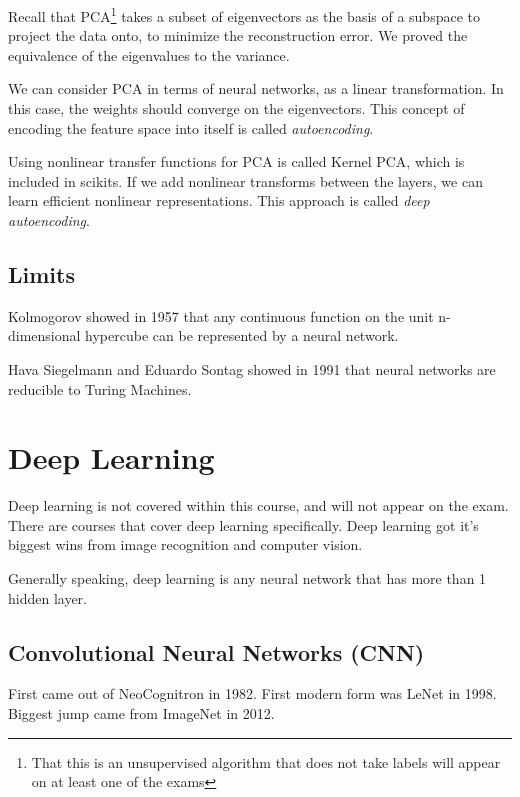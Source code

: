 \documentclass{idc_msc}
\begin{document}
Recall that PCA\footnote{That this is an unsupervised algorithm that does not take labels will appear on at least one of the exams} takes a subset of eigenvectors as the basis of a subspace to project the data onto, to minimize the reconstruction error.
We proved the equivalence of the eigenvalues to the variance.

We can consider PCA in terms of neural networks, as a linear transformation.
In this case, the weights should converge on the eigenvectors.
This concept of encoding the feature space into itself is called \emph{autoencoding}.

Using nonlinear transfer functions for PCA is called Kernel PCA, which is included in scikits.
If we add nonlinear transforms between the layers, we can learn efficient nonlinear representations.
This approach is called \emph{deep autoencoding}.

\subsection{Limits}

Kolmogorov showed in 1957 that any continuous function on the unit n-dimensional hypercube can be represented by a neural network.

Hava Siegelmann and Eduardo Sontag showed in 1991\cite{siegelmann1991turing} that neural networks are reducible to Turing Machines.


\clearpage
\section{Deep Learning}

Deep learning is not covered within this course, and will not appear on the exam.
There are courses that cover deep learning specifically.
Deep learning got it's biggest wins from image recognition and computer vision.

Generally speaking, deep learning is any neural network that has more than 1 hidden layer.

\subsection{Convolutional Neural Networks (CNN)}

First came out of NeoCognitron\cite{fukushima1982neocognitron} in 1982.
First modern form was LeNet\cite{lecun1995learning} in 1998.
Biggest jump came from ImageNet\cite{krizhevsky2012imagenet} in 2012.
\end{document}

